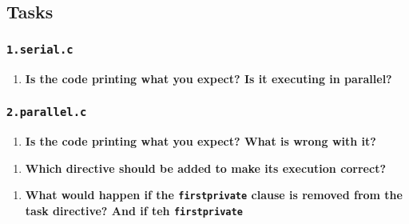 \documentclass[a4paper]{article}
\begin{document}
\subsection{Tasks}
\subsubsection{\texttt{1.serial.c}}

\begin{enumerate}
	\item \textbf{Is the code printing what you expect? Is it executing in parallel?}
\end{enumerate}

\subsubsection{\texttt{2.parallel.c}}
\begin{enumerate}
	\item \textbf{Is the code printing what you expect? What is wrong with it?}
\end{enumerate}

\begin{enumerate}[resume]
	\item \textbf{Which directive should be added to make its execution correct?}
\end{enumerate}

\begin{enumerate}[resume]
	\item \textbf{What would happen if the \texttt{firstprivate} clause is removed from the task directive? And if teh \texttt{firstprivate}}
\end{enumerate}
\end{document}
